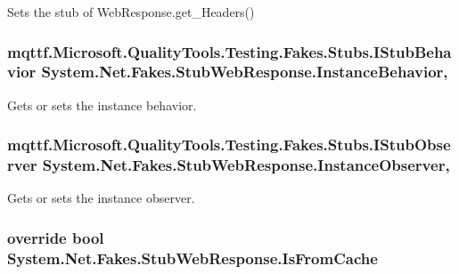 Sets the stub of Web\-Response.\-get\-\_\-\-Headers()

\hypertarget{class_system_1_1_net_1_1_fakes_1_1_stub_web_response_ada63f67c0baf936c7862a471bd7e3c8e}{
\subsubsection[{Instance\-Behavior}]{\setlength{\rightskip}{0pt plus 5cm}mqttf.\-Microsoft.\-Quality\-Tools.\-Testing.\-Fakes.\-Stubs.\-I\-Stub\-Behavior System.\-Net.\-Fakes.\-Stub\-Web\-Response.\-Instance\-Behavior\hspace{0.3cm}{\ttfamily [get]}, {\ttfamily [set]}}}\label{class_system_1_1_net_1_1_fakes_1_1_stub_web_response_ada63f67c0baf936c7862a471bd7e3c8e}


Gets or sets the instance behavior.

\hypertarget{class_system_1_1_net_1_1_fakes_1_1_stub_web_response_a793953bbf5781ff39e118ed1cce4f564}{
\subsubsection[{Instance\-Observer}]{\setlength{\rightskip}{0pt plus 5cm}mqttf.\-Microsoft.\-Quality\-Tools.\-Testing.\-Fakes.\-Stubs.\-I\-Stub\-Observer System.\-Net.\-Fakes.\-Stub\-Web\-Response.\-Instance\-Observer\hspace{0.3cm}{\ttfamily [get]}, {\ttfamily [set]}}}\label{class_system_1_1_net_1_1_fakes_1_1_stub_web_response_a793953bbf5781ff39e118ed1cce4f564}


Gets or sets the instance observer.

\hypertarget{class_system_1_1_net_1_1_fakes_1_1_stub_web_response_a106f46afa74a9c40e75b07c56eb8cd66}{
\subsubsection[{Is\-From\-Cache}]{\setlength{\rightskip}{0pt plus 5cm}override bool System.\-Net.\-Fakes.\-Stub\-Web\-Response.\-Is\-From\-Cache\hspace{0.3cm}{\ttfamily [get]}}}\label{class_system_1_1_net_1_1_fakes_1_1_stub_web_response_a106f46afa74a9c40e75b07c56eb8cd66}


